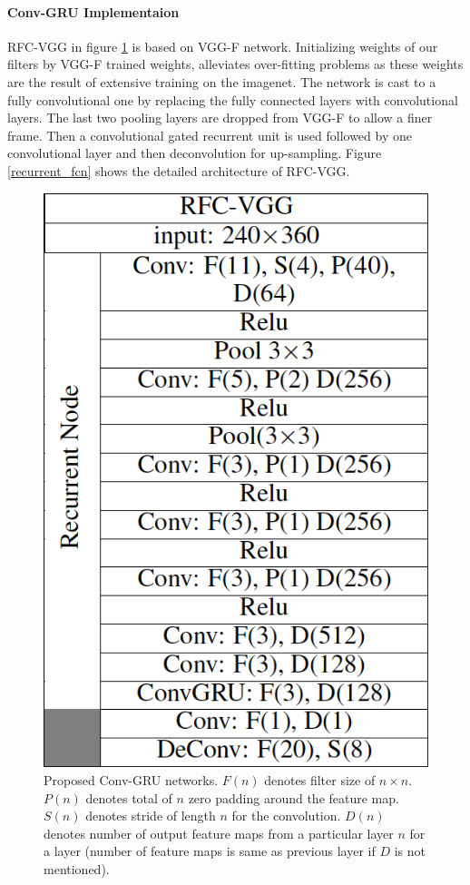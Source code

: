 \documentclass{article}
\begin{document}
\paragraph{Conv-GRU Implementaion}
RFC-VGG in figure \ref{conv-gru} is based on VGG-F \cite{imgRecog2014} network. Initializing weights of our filters by VGG-F trained weights, alleviates over-fitting problems as these weights are the result of extensive training on the imagenet. The network is cast to a fully convolutional one by replacing the fully connected layers with convolutional layers. The last two pooling layers are dropped from VGG-F to allow a finer frame. Then a convolutional gated recurrent unit is used followed by one convolutional layer and then deconvolution for up-sampling. Figure \ref{recurrent_fcn} shows the detailed architecture of RFC-VGG.
\begin{figure}[h]
  \centering
  \includegraphics[scale=0.2]{conv-gru.png} 
  \caption{Proposed Conv-GRU networks. $F(n)$ denotes filter size of $n \times n$. $P(n)$ denotes total of $n$ zero padding around the feature map. $S(n)$ denotes stride of length $n$ for the convolution. $D(n)$ denotes number of output feature maps from a particular layer $n$ for a layer (number of feature maps is same as previous layer if $D$ is not mentioned).}
    \label{conv-gru}
\end{figure}
\end{document}
